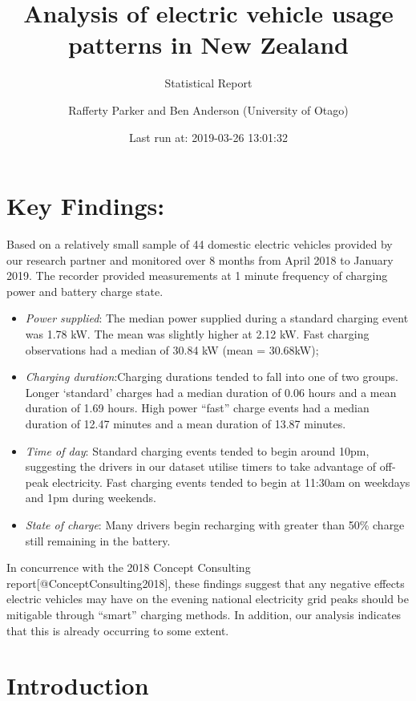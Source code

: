 \documentclass[]{article}
\title{Analysis of electric vehicle usage patterns in New Zealand}
\subtitle{Statistical Report}
\author{Rafferty Parker and Ben Anderson (University of Otago)}
\date{Last run at: 2019-03-26 13:01:32}
\providecommand{\tightlist}{%
  \setlength{\itemsep}{0pt}\setlength{\parskip}{0pt}}
\begin{document}
\maketitle

{
\setcounter{tocdepth}{2}
\tableofcontents
}
\section{Key Findings:}\label{keyFindings}

Based on a relatively small sample of 44 domestic electric vehicles
provided by our research partner and monitored over 8 months from April
2018 to January 2019. The recorder provided measurements at 1 minute
frequency of charging power and battery charge state.

\begin{itemize}
\tightlist
\item
  \emph{Power supplied}: The median power supplied during a standard
  charging event was 1.78 kW. The mean was slightly higher at 2.12 kW.
  Fast charging observations had a median of 30.84 kW (mean = 30.68kW);
\item
  \emph{Charging duration}:Charging durations tended to fall into one of
  two groups. Longer `standard' charges had a median duration of 0.06
  hours and a mean duration of 1.69 hours. High power ``fast'' charge
  events had a median duration of 12.47 minutes and a mean duration of
  13.87 minutes.
\item
  \emph{Time of day}: Standard charging events tended to begin around
  10pm, suggesting the drivers in our dataset utilise timers to take
  advantage of off-peak electricity. Fast charging events tended to
  begin at 11:30am on weekdays and 1pm during weekends.
\item
  \emph{State of charge}: Many drivers begin recharging with greater
  than 50\% charge still remaining in the battery.
\end{itemize}

In concurrence with the 2018 Concept Consulting
report{[}@ConceptConsulting2018{]}, these findings suggest that any
negative effects electric vehicles may have on the evening national
electricity grid peaks should be mitigable through ``smart'' charging
methods. In addition, our analysis indicates that this is already
occurring to some extent.

\section{Introduction}\label{introduction}
\end{document}

